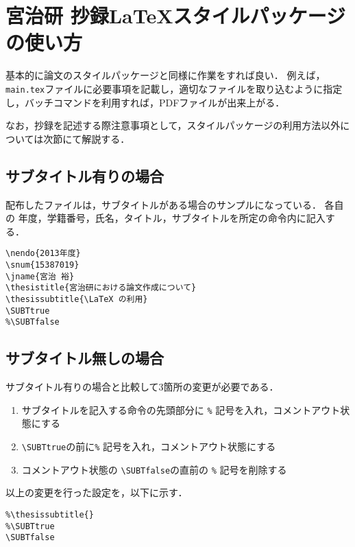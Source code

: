 \section{宮治研 抄録\LaTeX スタイルパッケージの使い方}
基本的に論文のスタイルパッケージと同様に作業をすれば良い．
例えば，\verb+main.tex+ファイルに必要事項を記載し，適切なファイルを取り込むように指定し，バッチコマンドを利用すれば，PDFファイルが出来上がる．

なお，抄録を記述する際注意事項として，スタイルパッケージの利用方法以外については次節にて解説する．

\subsection{サブタイトル有りの場合}
配布したファイルは，サブタイトルがある場合のサンプルになっている．
各自の 年度，学籍番号，氏名，タイトル，サブタイトルを所定の命令内に記入する．
\begin{screen}
{\small
\begin{verbatim}
\nendo{2013年度}
\snum{15387019}
\jname{宮治 裕}
\thesistitle{宮治研における論文作成について}
\thesissubtitle{\LaTeX の利用}
\SUBTtrue
%\SUBTfalse
\end{verbatim}
}
\end{screen}

\subsection{サブタイトル無しの場合}
サブタイトル有りの場合と比較して3箇所の変更が必要である．
\begin{enumerate}
\item サブタイトルを記入する命令の先頭部分に \verb+%+ 記号を入れ，コメントアウト状態にする
\item \verb+\SUBTtrue+の前に\verb+%+ 記号を入れ，コメントアウト状態にする
\item コメントアウト状態の \verb+\SUBTfalse+の直前の \verb+%+ 記号を削除する
\end{enumerate}
以上の変更を行った設定を，以下に示す．
\begin{screen}
{\small
\begin{verbatim}
%\thesissubtitle{}
%\SUBTtrue
\SUBTfalse
\end{verbatim}
}
\end{screen}
